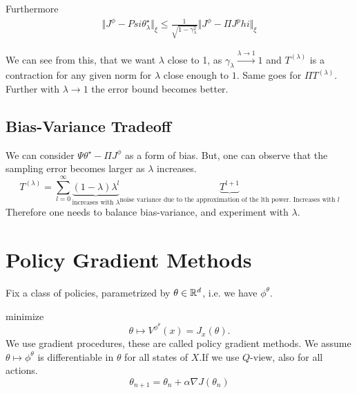 Furthermore 
\begin{align*}
    \Vert J^\phi-Psi\theta_\lambda^\star\Vert_\xi\leq \frac{1}{\sqrt{1-\gamma_\lambda^2}}\Vert J^\phi-\Pi J^phi\Vert_\xi 
\end{align*}

We can see from this, that we want \(\lambda\) close to 1, as \(\gamma_\lambda\stackrel{\lambda\to 1}{\to}1\)
and \(T^{(\lambda)}\) is a contraction for any given norm for \(\lambda\) close enough to \(1\).
Same goes for \(\Pi T^{(\lambda)}\). Further with \(\lambda\to 1\) the error bound becomes better.

\subsection{Bias-Variance Tradeoff}

We can consider \(\Psi\theta^\star-\Pi J^\phi\) as a form of bias.
But, one can observe that the sampling error becomes larger as \(\lambda\) increases.
\[T^{(\lambda)}=\sum_{l=0}^\infty \underbrace{(1-\lambda)\lambda^l}_{\text{increases with }\lambda} \underbrace{T^{l+1}}_{\text{noise variance due to the approximation of the lth power. Increases with } l}\]
Therefore one needs to balance bias-variance, and experiment with \(\lambda\).


\section{Policy Gradient Methods}



Fix a class of policies, parametrized by \(\theta\in \mathbb{R}^d\), i.e. we have \(\phi^\theta\). 

 minimize \[\theta\mapsto V^{\phi^\theta}(x)=J_x(\theta).\]
We use gradient procedures, these are called policy gradient methods. We assume \(\theta\mapsto \phi^\theta\)
is differentiable in \(\theta\) for all states of \(X\).If we use \(Q\)-view, also for all actions.
\begin{equation}\label{eq:pg_update}
    \theta_{n+1}=\theta_n+\alpha\nabla J(\theta_n)  
\end{equation}

